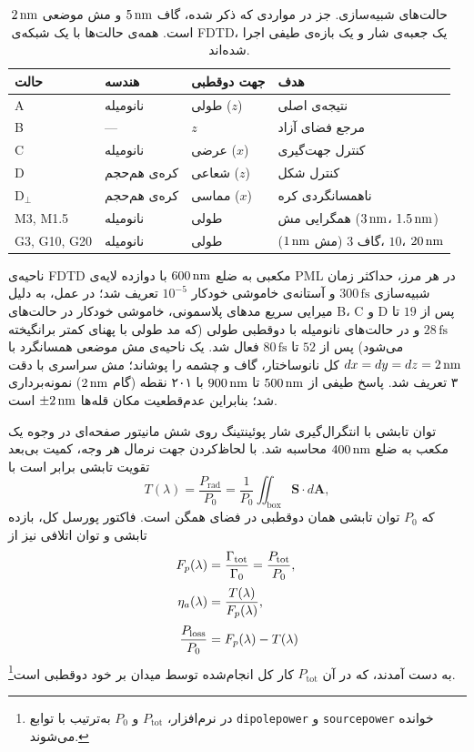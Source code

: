 \begin{table}[htbp]
  \centering
  \caption{حالت‌های شبیه‌سازی. جز در مواردی که ذکر شده، گاف $5\,\text{nm}$ و
  مش موضعی $2\,\text{nm}$ است. همه‌ی حالت‌ها با یک شبکه‌ی FDTD، یک جعبه‌ی شار
  و یک بازه‌ی طیفی اجرا شده‌اند.}
  \label{tab:cases}
  \begin{tabular}{llll}
    \toprule
    حالت & هندسه & جهت دوقطبی & هدف \\
    \midrule
    A & نانومیله & طولی ($z$) & نتیجه‌ی اصلی \\
    B & — & $z$ & مرجع فضای آزاد \\
    C & نانومیله & عرضی ($x$) & کنترل جهت‌گیری \\
    D & کره‌ی هم‌حجم & شعاعی ($z$) & کنترل شکل \\
    D$_\perp$ & کره‌ی هم‌حجم & مماسی ($x$) & ناهمسانگردی کره \\
    M3, M1.5 & نانومیله & طولی & همگرایی مش ($3\,\text{nm}$، $1.5\,\text{nm}$) \\
    G3, G10, G20 & نانومیله & طولی & گاف $3$ (مش $1\,\text{nm}$)، $10$، $20\,\text{nm}$ \\
    \bottomrule
  \end{tabular}
\end{table}

ناحیه‌ی FDTD مکعبی به ضلع $600\,\text{nm}$ با دوازده لایه‌ی PML در هر مرز،
حداکثر زمان شبیه‌سازی $300\,\text{fs}$ و آستانه‌ی خاموشی خودکار $10^{-5}$
تعریف شد؛ در عمل، به دلیل میرایی سریع مدهای پلاسمونی، خاموشی خودکار در
حالت‌های B، C و D پس از $19$ تا $28\,\text{fs}$ و در حالت‌های نانومیله
با دوقطبی طولی (که مد طولی با پهنای کمتر برانگیخته می‌شود) پس از $52$ تا
$80\,\text{fs}$ فعال شد. یک ناحیه‌ی مش موضعی همسانگرد با
$dx = dy = dz = 2\,\text{nm}$ کل نانوساختار، گاف و چشمه را پوشاند؛ مش سراسری
با دقت ۳ تعریف شد. پاسخ طیفی از $500\,\text{nm}$ تا $900\,\text{nm}$ با ۲۰۱ نقطه
(گام $2\,\text{nm}$) نمونه‌برداری شد؛ بنابراین عدم‌قطعیت مکان قله‌ها
$\pm2\,\text{nm}$ است.

توان تابشی با انتگرال‌گیری شار پوئینتینگ روی شش مانیتور صفحه‌ای در وجوه
یک مکعب به ضلع $400\,\text{nm}$ محاسبه شد. با لحاظ‌کردن جهت نرمال هر وجه،
کمیت بی‌بعد تقویت تابشی برابر است با
%
\begin{equation}
  T(\lambda) = \frac{P_{\text{rad}}}{P_0}
  = \frac{1}{P_0}\iint_{\text{box}} \mathbf{S}\cdot d\mathbf{A},
  \label{eq:T}
\end{equation}
%
که $P_0$ توان تابشی همان دوقطبی در فضای همگن است. فاکتور پورسل کل،
بازده تابشی و توان اتلافی نیز از
%
\begin{align}
  F_p(\lambda) &= \frac{\Gamma_{\text{tot}}}{\Gamma_0}
                = \frac{P_{\text{tot}}}{P_0}, \label{eq:Fp} \\[2pt]
  \eta_a(\lambda) &= \frac{T(\lambda)}{F_p(\lambda)}, \label{eq:eta} \\[2pt]
  \frac{P_{\text{loss}}}{P_0} &= F_p(\lambda) - T(\lambda) \label{eq:loss}
\end{align}
%
به دست آمدند، که در آن $P_{\text{tot}}$ کار کل انجام‌شده توسط میدان بر
خود دوقطبی است\footnote{در نرم‌افزار، $P_{\text{tot}}$ و $P_0$ به‌ترتیب با
توابع \texttt{dipolepower} و \texttt{sourcepower} خوانده می‌شوند.}.

